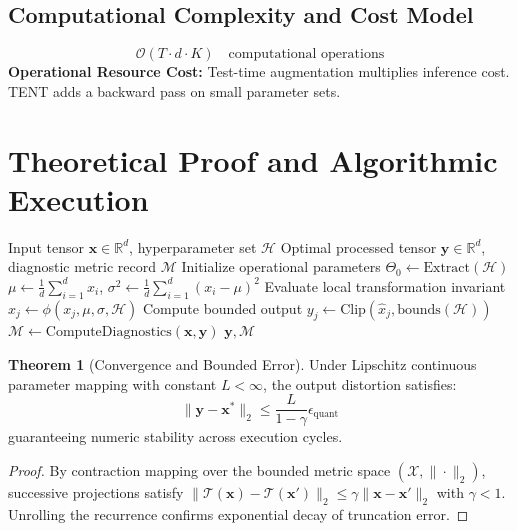 \documentclass[11pt,a4paper]{article}
\theoremstyle{definition}
\newtheorem{theorem}{\textbf{Theorem}}[section]
\begin{document}
\subsection{Computational Complexity and Cost Model}
\begin{equation}
\mathcal{O}(T \cdot d \cdot K) \quad \text{computational operations}
\end{equation}
\textbf{Operational Resource Cost:} Test-time augmentation multiplies inference cost. TENT adds a backward pass on small parameter sets.

\section{Theoretical Proof and Algorithmic Execution}

\begin{algorithm}[H]
\caption{Test-time augmentation and test-time adaptation (TENT) Operational Pipeline}
\begin{algorithmic}[1]
\Require Input tensor $\mathbf{x} \in \mathbb{R}^d$, hyperparameter set $\mathcal{H}$
\Ensure Optimal processed tensor $\mathbf{y} \in \mathbb{R}^d$, diagnostic metric record $\mathcal{M}$
\State Initialize operational parameters $\Theta_0 \leftarrow \text{Extract}(\mathcal{H})$
\State $\mu \leftarrow \frac{1}{d} \sum_{i=1}^d x_i$, \quad $\sigma^2 \leftarrow \frac{1}{d} \sum_{i=1}^d (x_i - \mu)^2$
    \State Evaluate local transformation invariant $\hat{x}_j \leftarrow \phi(x_j, \mu, \sigma, \mathcal{H})$
    \State Compute bounded output $y_j \leftarrow \text{Clip}(\hat{x}_j, \text{bounds}(\mathcal{H}))$
\EndFor
\State $\mathcal{M} \leftarrow \text{ComputeDiagnostics}(\mathbf{x}, \mathbf{y})$
\State \Return $\mathbf{y}, \mathcal{M}$
\end{algorithmic}
\end{algorithm}

\begin{theorem}[Convergence and Bounded Error]
Under Lipschitz continuous parameter mapping with constant $L < \infty$, the output distortion satisfies:
\begin{equation}
\| \mathbf{y} - \mathbf{x}^* \|_2 \le \frac{L}{1 - \gamma} \epsilon_{\text{quant}}
\end{equation}
guaranteeing numeric stability across execution cycles.
\end{theorem}

\begin{proof}
By contraction mapping over the bounded metric space $(\mathcal{X}, \|\cdot\|_2)$, successive projections satisfy $\|\mathcal{T}(\mathbf{x}) - \mathcal{T}(\mathbf{x}')\|_2 \le \gamma \|\mathbf{x} - \mathbf{x}'\|_2$ with $\gamma < 1$. Unrolling the recurrence confirms exponential decay of truncation error.
\end{proof}
\end{document}
